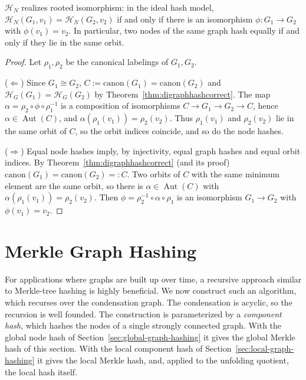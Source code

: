 \documentclass[twoside,leqno]{article}
\DeclareMathOperator{\Aut}{Aut}
\newcommand{\HG}{\mathcal{H}_{G}}
\newcommand{\HN}{\mathcal{H}_{N}}
\newcommand{\canon}{\mathrm{canon}}
\newcommand{\iso}{\cong}
\begin{document}
\begin{theorem}
\label{thm:digraphnodehashcorrect}
$\HN$ realizes rooted isomorphism: in the ideal hash model, $\HN(G_1, v_1)=\HN(G_2, v_2)$ if and only if there is an isomorphism $\phi : G_1 \to G_2$ with $\phi(v_1) = v_2$. In particular, two nodes of the same graph hash equally if and only if they lie in the same orbit.
\end{theorem}

\begin{proof}
Let $\rho_1,\rho_2$ be the canonical labelings of $G_1,G_2$.

($\Leftarrow$) Since $G_1\iso G_2$, $C:=\canon(G_1)=\canon(G_2)$ and $\HG(G_1)=\HG(G_2)$ by Theorem~\ref{thm:digraphhashcorrect}. The map $\alpha = \rho_2\circ\phi\circ\rho_1^{-1}$ is a composition of isomorphisms $C \to G_1 \to G_2 \to C$, hence $\alpha\in\Aut(C)$, and $\alpha(\rho_1(v_1)) = \rho_2(v_2)$. Thus $\rho_1(v_1)$ and $\rho_2(v_2)$ lie in the same orbit of $C$, so the orbit indices coincide, and so do the node hashes.

($\Rightarrow$) Equal node hashes imply, by injectivity, equal graph hashes and equal orbit indices. By Theorem~\ref{thm:digraphhashcorrect} (and its proof) $\canon(G_1)=\canon(G_2)=:C$. Two orbits of $C$ with the same minimum element are the same orbit, so there is $\alpha \in \Aut(C)$ with $\alpha(\rho_1(v_1)) = \rho_2(v_2)$. Then $\phi = \rho_2^{-1}\circ\alpha\circ\rho_1$ is an isomorphism $G_1 \to G_2$ with $\phi(v_1)=v_2$.
\end{proof}

\section{Merkle Graph Hashing}
\label{sec:merkle-graph-hashing}

For applications where graphs are built up over time, a recursive approach similar to Merkle-tree hashing is highly beneficial. We now construct such an algorithm, which recurses over the condensation graph. The condensation is acyclic, so the recursion is well founded. The construction is parameterized by a \emph{component hash}, which hashes the nodes of a single strongly connected graph. With the global node hash of Section~\ref{sec:global-graph-hashing} it gives the global Merkle hash of this section. With the local component hash of Section~\ref{sec:local-graph-hashing} it gives the local Merkle hash, and, applied to the unfolding quotient, the local hash itself.
\end{document}
